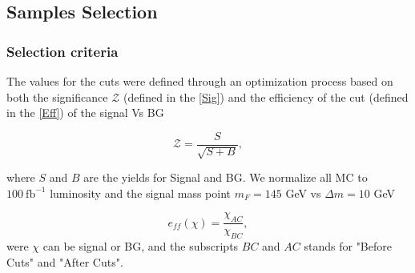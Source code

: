 \documentclass{beamer}
\begin{document}
\begin{frame}
\begin{figure}[!h]
\begin{subfigure}[b]{0.44\textwidth}
		\caption{\label{HT}}
	\end{subfigure}
	\caption{  }
\end{figure}


\end{frame}


\begin{frame}
\section{Samples Selection}
\frametitle{Selection criteria}
\begin{justify}
	The values for the cuts were defined through an optimization process based on both the significance $\mathcal{Z}$ (defined in the \ref{Sig}) and the efficiency of the cut (defined in the \ref{Eff}) of the signal Vs BG 
	
	\begin{equation}
		\mathcal{Z}=\frac{S}{\sqrt{S+B}},\label{Sig}
	\end{equation}
	
	where $S$ and $B$ are the yields for Signal and BG. We normalize all MC to $100~\text{fb}^{-1}$ luminosity and the	signal mass point  $m_{F}=145$ GeV vs  $\Delta m=10$ GeV

	\begin{equation}
	e_{ff}(\chi)=\frac{\chi_{AC}}{\chi_{BC}},\label{Eff}
	\end{equation}
	were $\chi$ can be signal or BG, and the subscripts $BC$ and $AC$ stands for "Before Cuts" and "After Cuts".

\end{justify}

\end{frame}

\end{document}
